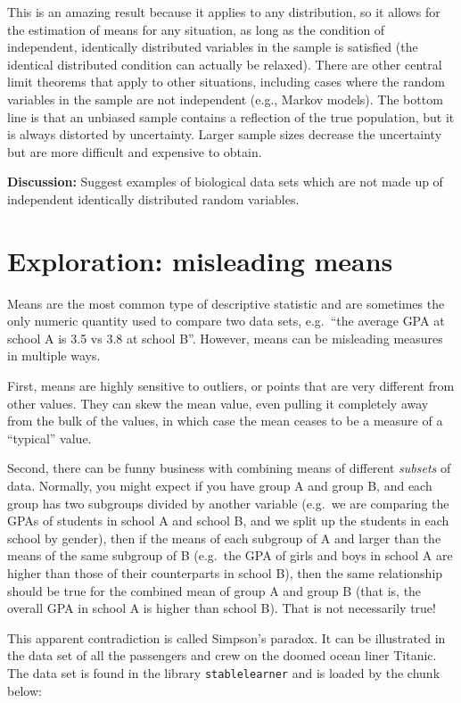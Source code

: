 \documentclass[
  letterpaper,
  DIV=11,
  numbers=noendperiod]{scrreprt}
\begin{document}
This is an amazing result because it applies to any distribution, so it
allows for the estimation of means for any situation, as long as the
condition of independent, identically distributed variables in the
sample is satisfied (the identical distributed condition can actually be
relaxed). There are other central limit theorems that apply to other
situations, including cases where the random variables in the sample are
not independent (e.g., Markov models). The bottom line is that an
unbiased sample contains a reflection of the true population, but it is
always distorted by uncertainty. Larger sample sizes decrease the
uncertainty but are more difficult and expensive to obtain.

\textbf{Discussion:} Suggest examples of biological data sets which are
not made up of independent identically distributed random variables.

\hypertarget{exploration-misleading-means}{%
\section{Exploration: misleading
means}\label{exploration-misleading-means}}

Means are the most common type of descriptive statistic and are
sometimes the only numeric quantity used to compare two data sets,
e.g.~``the average GPA at school A is 3.5 vs 3.8 at school B''. However,
means can be misleading measures in multiple ways.

First, means are highly sensitive to outliers, or points that are very
different from other values. They can skew the mean value, even pulling
it completely away from the bulk of the values, in which case the mean
ceases to be a measure of a ``typical'' value.

Second, there can be funny business with combining means of different
\emph{subsets} of data. Normally, you might expect if you have group A
and group B, and each group has two subgroups divided by another
variable (e.g.~we are comparing the GPAs of students in school A and
school B, and we split up the students in each school by gender), then
if the means of each subgroup of A and larger than the means of the same
subgroup of B (e.g.~the GPA of girls and boys in school A are higher
than those of their counterparts in school B), then the same
relationship should be true for the combined mean of group A and group B
(that is, the overall GPA in school A is higher than school B). That is
not necessarily true!

This apparent contradiction is called Simpson's paradox. It can be
illustrated in the data set of all the passengers and crew on the doomed
ocean liner Titanic. The data set is found in the library
\texttt{stablelearner} and is loaded by the chunk below:
\end{document}
